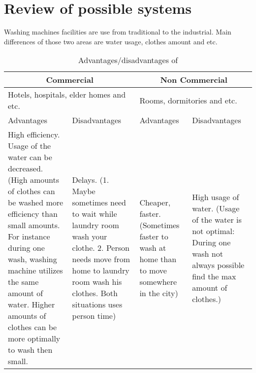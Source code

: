 \section{Review of possible systems}
Washing machines facilities are use from traditional to the industrial. Main differences of those two areas are water usage, clothes amount and etc.

\begin{table}[htbp]
	\centering
    \begin{tabular}{ | p{3.5cm} | p{3.5cm} | p{3.5cm} | p{3.5cm} |}
    \hline
    \multicolumn{2}{|c|}{\textbf{Commercial}} & \multicolumn{2}{|c|}{\textbf{Non Commercial}} \\ \hline
    \multicolumn{2}{|l|}{Hotels, hospitals, elder homes and etc.} & \multicolumn{2}{|l|}{Rooms, dormitories and etc.} \\ \hline
    Advantages & Disadvantages & Advantages & Disadvantages \\ \hline
    High efficiency. Usage of the water can be decreased. (High amounts of clothes can be washed more efficiency than small amounts. For instance during one wash, washing machine utilizes the same amount of water. Higher amounts of clothes can be more optimally to wash then small. & Delays. (1. Maybe sometimes need to wait while laundry room wash your clothe. 2. Person needs move from home to laundry room wash his clothes. Both situations uses person time) & Cheaper, faster. (Sometimes faster to wash at home than to move somewhere in the city) & High usage of water. (Usage of the water is not optimal: During one wash not always possible find the max amount of clothes.) \\ \hline
    \end{tabular}	\caption{Advantages/disadvantages of }
	\label{tab:AdDis}
\end{table}